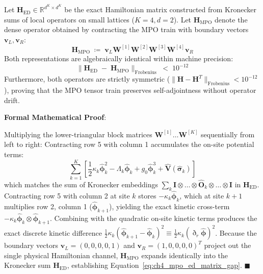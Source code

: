 \documentclass[
    12pt,
    a4paper,
    headings=normal,
    twoside=false,
    open=any,
    parskip=half
]{scrbook}
\newcommand{\ethop}{\eth}
\newenvironment{myproof}[1][]{%
  \par\vspace{6pt}\noindent\textbf{\sffamily\color{maincolor}Formal Mathematical Proof\ifstrempty{#1}{}{ (#1)}}:\par\nopagebreak
}{%
  \penalty50\hfill\ensuremath{\blacksquare}\par\vspace{6pt}
}
\begin{document}
\begin{phystheorem}\label{thm:ch4_mpo_ed_equivalence}
Let $\mathbf{H}_{\text{ED}} \in \mathbb{R}^{d^K \times d^K}$ be the exact Hamiltonian matrix constructed from Kronecker sums of local operators on small lattices ($K=4, d=2$). Let $\mathbf{H}_{\text{MPO}}$ denote the dense operator obtained by contracting the MPO train with boundary vectors $\mathbf{v}_L, \mathbf{v}_R$:
\begin{equation}
\mathbf{H}_{\text{MPO}} \;\coloneqq\; \mathbf{v}_L \mathbf{W}^{[1]} \mathbf{W}^{[2]} \mathbf{W}^{[3]} \mathbf{W}^{[4]} \mathbf{v}_R
\end{equation}
Both representations are algebraically identical within machine precision:
\begin{equation}
\boxed{\| \mathbf{H}_{\text{ED}} \;-\; \mathbf{H}_{\text{MPO}} \|_{\text{Frobenius}} \;<\; 10^{-12}}
\label{eq:ch4_mpo_ed_matrix_gap}
\end{equation}
Furthermore, both operators are strictly symmetric ($\| \mathbf{H} - \mathbf{H}^T \|_{\text{Frobenius}} < 10^{-12}$), proving that the MPO tensor train preserves self-adjointness without operator drift.
\end{phystheorem}

\begin{myproof}
Multiplying the lower-triangular block matrices $\mathbf{W}^{[1]} \dots \mathbf{W}^{[K]}$ sequentially from left to right:
Contracting row 5 with column 1 accumulates the on-site potential terms:
$$\sum_{k=1}^K \left[ \frac{1}{2}\kappa_k \hat{\boldsymbol{\phi}}_k^2 - \Lambda_k \hat{\boldsymbol{\phi}}_k + g_0 \hat{\boldsymbol{\phi}}_k^3 + \hat{\mathbf{V}}(\hat{\boldsymbol{\sigma}}_k) \right]$$
which matches the sum of Kronecker embeddings $\sum_k \mathbf{I} \otimes \dots \otimes \hat{\mathbf{O}}_k \otimes \dots \otimes \mathbf{I}$ in $\mathbf{H}_{\text{ED}}$.
Contracting row 5 with column 2 at site $k$ stores $-\kappa_k \hat{\boldsymbol{\phi}}_k$, which at site $k+1$ multiplies row 2, column 1 ($\hat{\boldsymbol{\phi}}_{k+1}$), yielding the exact kinetic cross-term $-\kappa_k \hat{\boldsymbol{\phi}}_k \otimes \hat{\boldsymbol{\phi}}_{k+1}$.
Combining with the quadratic on-site kinetic terms produces the exact discrete kinetic difference $\frac{1}{2}\kappa_k (\hat{\boldsymbol{\phi}}_{k+1} - \hat{\boldsymbol{\phi}}_k)^2 \equiv \frac{1}{2}\kappa_k (\ethop_r \hat{\boldsymbol{\phi}})^2$.
Because the boundary vectors $\mathbf{v}_L = (0,0,0,0,1)$ and $\mathbf{v}_R = (1,0,0,0,0)^T$ project out the single physical Hamiltonian channel, $\mathbf{H}_{\text{MPO}}$ expands identically into the Kronecker sum $\mathbf{H}_{\text{ED}}$, establishing Equation~\eqref{eq:ch4_mpo_ed_matrix_gap}.
\end{myproof}
\end{document}
